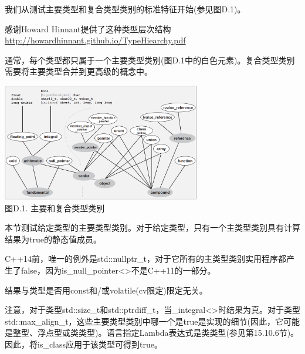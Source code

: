 
我们从测试主要类型和复合类型类别的标准特征开始(参见图D.1)。

\begin{tcolorbox}[colback=webgreen!5!white,colframe=webgreen!75!black]
\hspace*{0.75cm}感谢Howard Hinnant提供了这种类型层次结构\url{http://howardhinnant.github.io/TypeHiearchy.pdf}
\end{tcolorbox}

通常，每个类型都只属于一个主要类型类别(图D.1中的白色元素)。复合类型类别需要将主要类型合并到更高级的概念中。

\begin{center}
\includegraphics[width=0.65\textwidth]{content/Appendix/D/images/1.png} \\
图D.1. 主要和复合类型类别
\end{center}


本节测试给定类型的主要类型类别。对于给定类型，只有一个主类型类别具有计算结果为true的静态值成员。

\begin{tcolorbox}[colback=webgreen!5!white,colframe=webgreen!75!black]
\hspace*{0.75cm}C++14前，唯一的例外是std::nullptr\_t，对于它所有的主类型类别实用程序都产生了false，因为is\_null\_pointer<>不是C++11的一部分。
\end{tcolorbox}

结果与类型是否用const和/或volatile(cv限定)限定无关。

注意，对于类型std::size\_t和std::ptrdiff\_t，当\_integral<>时结果为真。对于类型std::max\_align\_t，这些主要类型类别中哪一个是true是实现的细节(因此，它可能是整型、浮点型或类类型)。语言指定Lambda表达式是类类型(参见第15.10.6节)。因此，将is\_class应用于该类型可得到true。

